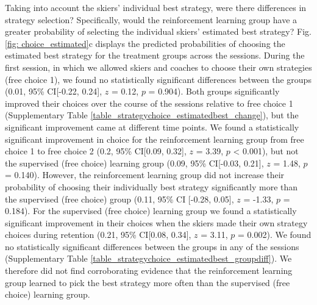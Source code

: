 \documentclass[pdflatex,sn-mathphys-num]{sn-jnl}%
\theoremstyle{thmstyleone}%
\theoremstyle{thmstyletwo}%
\theoremstyle{thmstylethree}%
\begin{document}
Taking into account the skiers' individual best strategy, were there differences in strategy selection? Specifically, would the reinforcement learning group have a greater probability of selecting the individual skiers' estimated best strategy?  Fig. \ref{fig: choice_estimated}c displays the predicted probabilities of choosing the estimated best strategy for the treatment groups across the sessions. During the first session, in which we allowed skiers and coaches to choose their own strategies (free choice 1),  we found no statistically significant differences between the groups (0.01, 95\% CI[-0.22, 0.24], $z$ = 0.12, $p$ = 0.904). Both groups significantly improved their choices over the course of the sessions relative to free choice 1 (Supplementary Table \ref{table_strategychoice_estimatedbest_change}), but the significant improvement came at different time points. We found a statistically significant improvement in choice for the reinforcement learning group from free choice 1 to free choice 2 (0.2, 95\% CI[0.09, 0.32], $z$ = 3.39, $p$ < 0.001), but not the supervised (free choice) learning group (0.09, 95\% CI[-0.03, 0.21], $z$ = 1.48, $p$ = 0.140). However, the reinforcement learning group did not increase their probability of choosing their individually best strategy significantly more than the supervised (free choice) group (0.11, 95\% CI [-0.28, 0.05], $z$ = -1.33, $p$ = 0.184). For the supervised (free choice) learning group we found a statistically significant improvement in their choices when the skiers made their own strategy choices during retention (0.21, 95\% CI[0.08, 0.34], $z$ = 3.11, $p$  =  0.002). We found no statistically significant differences between the groups in any of the sessions (Supplementary Table \ref{table_strategychoice_estimatedbest_groupdiff}). We therefore did not find corroborating evidence that the reinforcement learning group learned to pick the best strategy more often than the supervised (free choice) learning group. 
\end{document}
